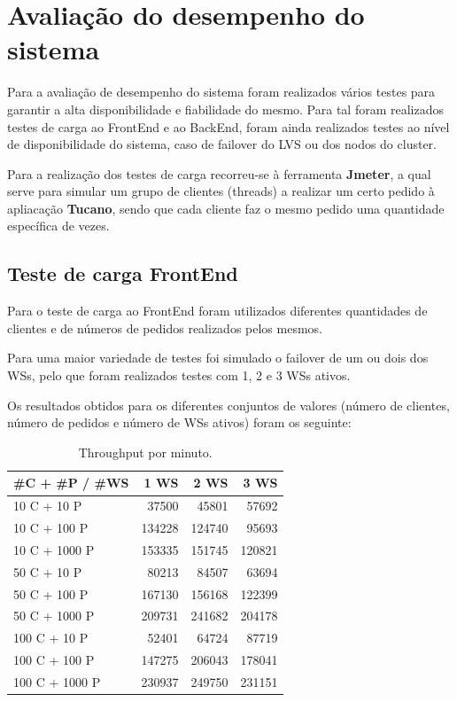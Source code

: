 \section{Avaliação do desempenho do sistema} \label{sec:avaldesemp}

\hspace{5mm} Para a avaliação de desempenho do sistema foram realizados vários testes para garantir a alta disponibilidade e fiabilidade do mesmo. Para tal foram realizados testes de carga ao FrontEnd e ao BackEnd, foram ainda realizados testes ao nível de disponibilidade do sistema, caso de failover do LVS ou dos nodos do cluster.

\hspace{5mm} Para a realização dos testes de carga recorreu-se à ferramenta \textbf{Jmeter}, a qual serve para simular um grupo de clientes (threads) a realizar um certo pedido à apliacação \textbf{Tucano}, sendo que cada cliente faz o mesmo pedido uma quantidade específica de vezes.

\subsection{Teste de carga FrontEnd} \label{subsec:testeFront}

\hspace{5mm} Para o teste de carga ao FrontEnd foram utilizados diferentes quantidades de clientes e de números de pedidos realizados pelos mesmos.

\hspace{5mm} Para uma maior variedade de testes foi simulado o failover de um ou dois dos WSs, pelo que foram realizados testes com 1, 2 e 3 WSs ativos.

\hspace{5mm} Os resultados obtidos para os diferentes conjuntos de valores (número de clientes, número de pedidos e número de WSs ativos) foram os seguinte:

\begin{table}[H]
    \centering
    \begin{tabular}{|l||r|r|r|}
    \hline
        \#C + \#P / \#WS & 1 WS & 2 WS & 3 WS\\ \hline \hline
        10 C + 10 P & 37500 & 45801 & 57692 \\ \hline
        10 C + 100 P & 134228 & 124740 & 95693 \\ \hline
        10 C + 1000 P & 153335 & 151745 & 120821 \\ \hline
        50 C + 10 P & 80213 & 84507 & 63694 \\ \hline
        50 C + 100 P & 167130 & 156168 & 122399 \\ \hline
        50 C + 1000 P & 209731 & 241682 & 204178 \\ \hline
        100 C + 10 P & 52401 & 64724 & 87719 \\ \hline
        100 C + 100 P & 147275 & 206043 & 178041 \\ \hline
        100 C + 1000 P & 230937 & 249750 & 231151 \\ \hline
    \end{tabular}
    \caption{Throughput por minuto.}
    \label{tab:testeFront}
\end{table}

